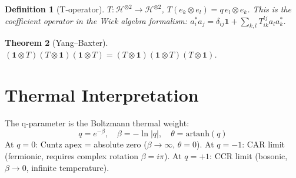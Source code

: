\documentclass{article}
\newtheorem{theorem}{Theorem}[section]
\newtheorem{definition}[theorem]{Definition}
\begin{document}
\begin{definition}[T-operator]
$T : \mathcal{H}^{\otimes 2} \to \mathcal{H}^{\otimes 2}$,
$T(e_k \otimes e_l) = q \, e_l \otimes e_k$.
This is the coefficient operator in the Wick algebra formalism:
$a_i^* a_j = \delta_{ij} \mathbf{1} + \sum_{k,l} T_{ik}^{lj} a_l a_k^*$.
\end{definition}

\begin{theorem}[Yang--Baxter]
$(\mathbf{1} \otimes T)(T \otimes \mathbf{1})(\mathbf{1} \otimes T) =
(T \otimes \mathbf{1})(\mathbf{1} \otimes T)(T \otimes \mathbf{1})$.
\end{theorem}

\section{Thermal Interpretation}

The q-parameter is the Boltzmann thermal weight:
\begin{equation}
q = e^{-\beta}, \quad \beta = -\ln|q|, \quad \theta = \mathrm{artanh}(q)
\end{equation}
At $q=0$: Cuntz apex = absolute zero ($\beta \to \infty$, $\theta = 0$).
At $q=-1$: CAR limit (fermionic, requires complex rotation $\beta = i\pi$).
At $q=+1$: CCR limit (bosonic, $\beta \to 0$, infinite temperature).
\end{document}
